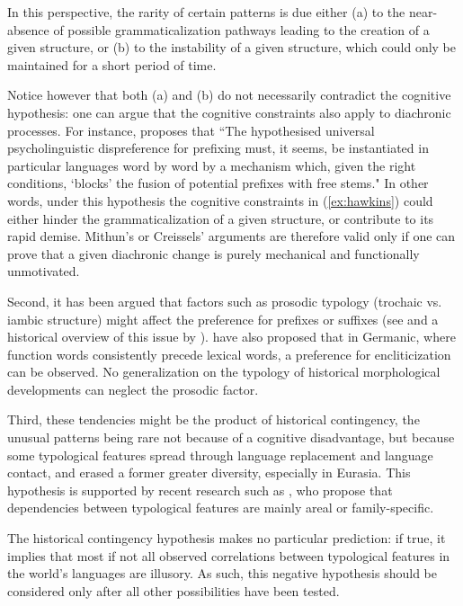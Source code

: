 \documentclass[oldfontcommands,twoside,a4paper,12pt]{article}
\begin{document}
 In this perspective, the rarity of certain patterns is due either (a) to the near-absence of possible grammaticalization pathways leading to the creation of a given structure, or (b) to the instability of a given structure, which could only be maintained for a short period of time.

 Notice however that both (a) and (b) do not necessarily contradict the cognitive hypothesis: one can argue that the cognitive constraints also apply to diachronic processes. For instance, \citet[166]{hall92morpho} proposes that ``The hypothesised universal psycholinguistic dispreference for prefixing must, it seems, be instantiated in particular languages word by word by a mechanism which, given the right conditions, `blocks' the fusion of potential prefixes with free stems." In other words, under this hypothesis the cognitive constraints in (\ref{ex:hawkins}) could either hinder the grammaticalization of a given structure, or contribute to its rapid demise. Mithun's or Creissels' arguments are therefore valid only if one can prove that a given diachronic change is purely mechanical and functionally unmotivated.
 
 
 Second, it has been argued that factors such as prosodic typology (trochaic vs. iambic structure) might affect the preference for prefixes or suffixes (see \citealt{donegan04munda} and a historical overview of this issue by \citealt{plank98covariation}). \citet{lahiri10phrasing} have also proposed that in Germanic, where function words consistently precede lexical words, a preference for encliticization can be observed.
 No generalization on the typology of historical morphological developments can neglect the prosodic factor.


Third, these tendencies might be the product of historical contingency, the unusual patterns being rare not because of a cognitive disadvantage, but because some typological features spread through language replacement and language contact, and erased a former greater diversity, especially in Eurasia.  This hypothesis is supported by recent research such as \citet{dunn11word.order}, who propose that dependencies between typological features are mainly areal or family-specific.

 
 The historical contingency hypothesis makes no particular prediction: if true, it implies that most if not all observed correlations between typological features in the world's languages are illusory. As such, this negative hypothesis should be considered only after all other possibilities have been tested.
\end{document}
